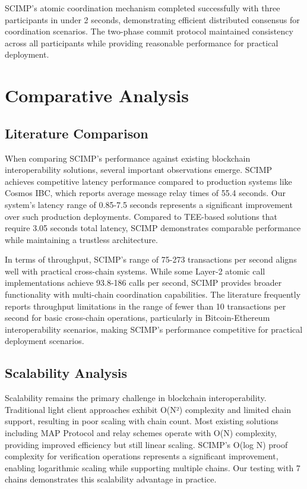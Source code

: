 SCIMP's atomic coordination mechanism completed successfully with three participants in under 2 seconds, demonstrating efficient distributed consensus for coordination scenarios. The two-phase commit protocol maintained consistency across all participants while providing reasonable performance for practical deployment.

\section{Comparative Analysis}

\subsection{Literature Comparison}

When comparing SCIMP's performance against existing blockchain interoperability solutions, several important observations emerge. SCIMP achieves competitive latency performance compared to production systems like Cosmos IBC, which reports average message relay times of 55.4 seconds. Our system's latency range of 0.85-7.5 seconds represents a significant improvement over such production deployments. Compared to TEE-based solutions that require 3.05 seconds total latency, SCIMP demonstrates comparable performance while maintaining a trustless architecture.

In terms of throughput, SCIMP's range of 75-273 transactions per second aligns well with practical cross-chain systems. While some Layer-2 atomic call implementations achieve 93.8-186 calls per second, SCIMP provides broader functionality with multi-chain coordination capabilities. The literature frequently reports throughput limitations in the range of fewer than 10 transactions per second for basic cross-chain operations, particularly in Bitcoin-Ethereum interoperability scenarios, making SCIMP's performance competitive for practical deployment scenarios.

\subsection{Scalability Analysis}

Scalability remains the primary challenge in blockchain interoperability. Traditional light client approaches exhibit O(N²) complexity and limited chain support, resulting in poor scaling with chain count. Most existing solutions including MAP Protocol and relay schemes operate with O(N) complexity, providing improved efficiency but still linear scaling. SCIMP's O(log N) proof complexity for verification operations represents a significant improvement, enabling logarithmic scaling while supporting multiple chains. Our testing with 7 chains demonstrates this scalability advantage in practice.

